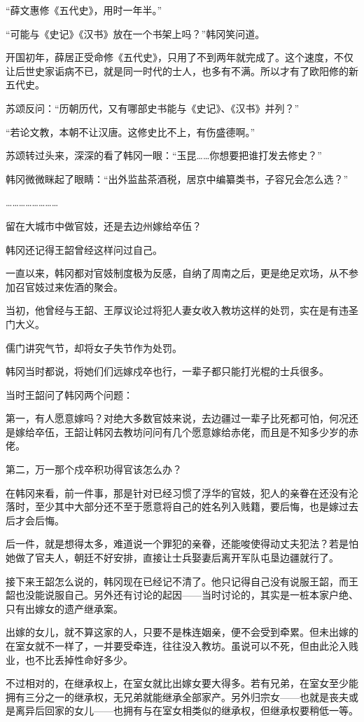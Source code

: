 “薛文惠修《五代史》，用时一年半。”

“可能与《史记》《汉书》放在一个书架上吗？”韩冈笑问道。

开国初年，薛居正受命修《五代史》，只用了不到两年就完成了。这个速度，不仅让后世史家诟病不已，就是同一时代的士人，也多有不满。所以才有了欧阳修的新五代史。

苏颂反问：“历朝历代，又有哪部史书能与《史记》、《汉书》并列？”

“若论文教，本朝不让汉唐。这修史比不上，有伤盛德啊。”

苏颂转过头来，深深的看了韩冈一眼：“玉昆……你想要把谁打发去修史？”

韩冈微微眯起了眼睛：“出外监盐茶酒税，居京中编纂类书，子容兄会怎么选？”

……………………

留在大城市中做官妓，还是去边州嫁给卒伍？

韩冈还记得王韶曾经这样问过自己。

一直以来，韩冈都对官妓制度极为反感，自纳了周南之后，更是绝足欢场，从不参加召官妓过来佐酒的聚会。

当初，他曾经与王韶、王厚议论过将犯人妻女收入教坊这样的处罚，实在是有违圣门大义。

儒门讲究气节，却将女子失节作为处罚。

韩冈当时都说，将她们们远嫁戍卒也行，一辈子都只能打光棍的士兵很多。

当时王韶问了韩冈两个问题：

第一，有人愿意嫁吗？对绝大多数官妓来说，去边疆过一辈子比死都可怕，何况还是嫁给卒伍，王韶让韩冈去教坊问问有几个愿意嫁给赤佬，而且是不知多少岁的赤佬。

第二，万一那个戍卒积功得官该怎么办？

在韩冈来看，前一件事，那是针对已经习惯了浮华的官妓，犯人的亲眷在还没有沦落时，至少其中大部分还不至于愿意将自己的姓名列入贱籍，要后悔，也是嫁过去后才会后悔。

后一件，就是想得太多，难道说一个罪犯的亲眷，还能唆使得动丈夫犯法？若是怕她做了官夫人，朝廷不好安排，直接让士兵娶妻后离开军队屯垦边疆就行了。

接下来王韶怎么说的，韩冈现在已经记不清了。他只记得自己没有说服王韶，而王韶也没能说服自己。另外还有讨论的起因——当时讨论的，其实是一桩本家户绝、只有出嫁女的遗产继承案。

出嫁的女儿，就不算这家的人，只要不是株连姻亲，便不会受到牵累。但未出嫁的在室女就不一样了，一并要受牵连，往往没入教坊。虽说可以不死，但由此沦入贱业，也不比丢掉性命好多少。

不过相对的，在继承权上，在室女就比出嫁女要大得多。若有兄弟，在室女至少能拥有三分之一的继承权，无兄弟就能继承全部家产。另外归宗女——也就是丧夫或是离异后回家的女儿——也拥有与在室女相类似的继承权，但继承权要稍低一等。

